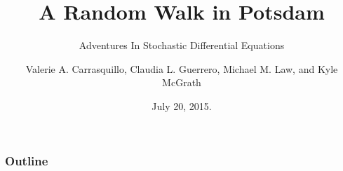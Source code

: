 \documentclass{beamer}
\begin{document}
\author{Valerie A. Carrasquillo\footnotemark[1], 
  Claudia L. Guerrero\footnotemark[2], 
  Michael M. Law\footnotemark[3], and 
  Kyle McGrath\footnotemark[4]}
  
\title{A Random Walk in Potsdam}
\subtitle{Adventures In Stochastic Differential Equations}
\date{July 20, 2015.}

\begin{frame}
  \titlepage
\end{frame}

\begin{frame}
  \frametitle{Outline}
  \tableofcontents
\end{frame}






\end{document}

